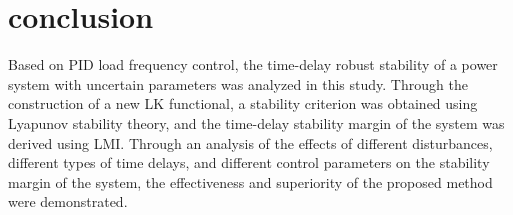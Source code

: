 \documentclass[journal]{IEEEtran}
\begin{document}
\section{conclusion}
Based on PID load frequency control, the time-delay robust stability of a power system with uncertain parameters was analyzed in this study. Through the construction of a new LK functional, a stability criterion was obtained using Lyapunov stability theory, and the time-delay stability margin of the system was derived using LMI. Through an analysis of the effects of different disturbances, different types of time delays, and different control parameters on the stability margin of the system, the effectiveness and superiority of the proposed method were demonstrated. 



\end{document}
